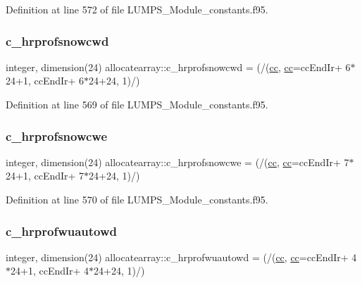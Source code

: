 Definition at line 572 of file L\+U\+M\+P\+S\+\_\+\+Module\+\_\+constants.\+f95.

\mbox{\label{namespaceallocatearray_a5bb712bf9b293e1fe78c4c1391d770a1}} 
\subsubsection{\texorpdfstring{c\+\_\+hrprofsnowcwd}{c\_hrprofsnowcwd}}
{\footnotesize\ttfamily integer, dimension(24) allocatearray\+::c\+\_\+hrprofsnowcwd = (/(\hyperlink{namespaceallocatearray_ac863c81704eb507dee10f5e10741e10c}{cc}, \hyperlink{namespaceallocatearray_ac863c81704eb507dee10f5e10741e10c}{cc}=cc\+End\+Ir+ 6$\ast$24+1, cc\+End\+Ir+ 6$\ast$24+24, 1)/)}



Definition at line 569 of file L\+U\+M\+P\+S\+\_\+\+Module\+\_\+constants.\+f95.

\mbox{\label{namespaceallocatearray_a16a857c23efefa766fbf96ce2b908860}} 
\subsubsection{\texorpdfstring{c\+\_\+hrprofsnowcwe}{c\_hrprofsnowcwe}}
{\footnotesize\ttfamily integer, dimension(24) allocatearray\+::c\+\_\+hrprofsnowcwe = (/(\hyperlink{namespaceallocatearray_ac863c81704eb507dee10f5e10741e10c}{cc}, \hyperlink{namespaceallocatearray_ac863c81704eb507dee10f5e10741e10c}{cc}=cc\+End\+Ir+ 7$\ast$24+1, cc\+End\+Ir+ 7$\ast$24+24, 1)/)}



Definition at line 570 of file L\+U\+M\+P\+S\+\_\+\+Module\+\_\+constants.\+f95.

\mbox{\label{namespaceallocatearray_a374cc489abdda983951d0906c58b8577}} 
\subsubsection{\texorpdfstring{c\+\_\+hrprofwuautowd}{c\_hrprofwuautowd}}
{\footnotesize\ttfamily integer, dimension(24) allocatearray\+::c\+\_\+hrprofwuautowd = (/(\hyperlink{namespaceallocatearray_ac863c81704eb507dee10f5e10741e10c}{cc}, \hyperlink{namespaceallocatearray_ac863c81704eb507dee10f5e10741e10c}{cc}=cc\+End\+Ir+ 4$\ast$24+1, cc\+End\+Ir+ 4$\ast$24+24, 1)/)}



